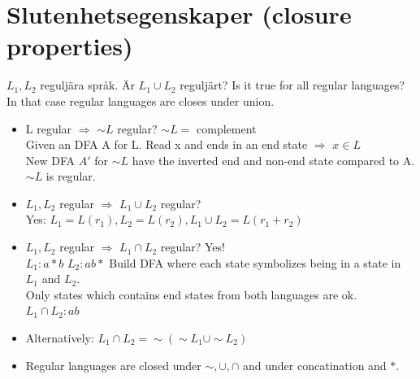 \documentclass[a4paper]{article}
\begin{document}
    \section{Slutenhetsegenskaper (closure properties)}
    $L_1,L_2$ reguljära språk. Är $L_1\cup L_2$ reguljärt? Is it true for all
    regular languages? In that case regular languages are closes under union.
    \begin{itemize}
        \item L regular $\Rightarrow$ $\sim L$ regular? $\sim L =$ complement\\
            Given an DFA A for L. Read x and ends in an end state $\Rightarrow$ $x\in L$\\
            New DFA $A'$ for $\sim L$ have the inverted end and non-end state compared to A.\\
            $\sim L$ is regular.
        \item $L_1,L_2$ regular $\Rightarrow$ $L_1 \cup L_2$ regular?\\
            Yes: $L_1=L(r_1),L_2=L(r_2),L_1\cup L_2 = L(r_1+r_2)$
        \item $L_1,L_2$ regular $\Rightarrow$ $L_1 \cap L_2$ regular? Yes!\\
            $L_1:a*b$ $L_2:ab*$ Build DFA where each state symbolizes being in a state in $L_1$ and $L_2$.\\
            Only states which contains end states from both languages are ok.\\
            $L_1\cap L_2: ab$
        \item Alternatively: $L_1\cap L_2 = \sim (\sim L_1 \cup \sim L_2)$
        \item Regular languages are closed under $\sim,\cup,\cap$ and under concatination and $*$.
    \end{itemize}
\end{document}
